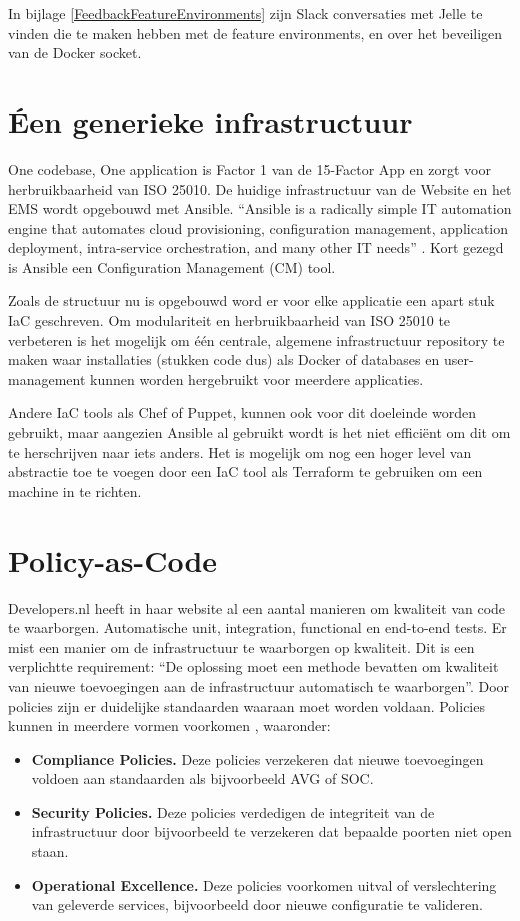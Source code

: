 In bijlage \ref{FeedbackFeatureEnvironments} zijn Slack conversaties met Jelle te vinden die te maken hebben met de feature environments, en over het beveiligen van de Docker socket.

\section{Éen generieke infrastructuur}
One codebase, One application is Factor 1 van de 15-Factor App en zorgt voor herbruikbaarheid van ISO 25010. De huidige infrastructuur van de Website en het EMS wordt opgebouwd met Ansible. \enquote{Ansible is a radically simple IT automation engine that automates cloud provisioning, configuration management, application deployment, intra-service orchestration, and many other IT needs} \parencite{Ansible}. Kort gezegd is Ansible een Configuration Management (CM) tool.

Zoals de structuur nu is opgebouwd word er voor elke applicatie een apart stuk IaC geschreven. Om modulariteit en herbruikbaarheid van ISO 25010 \parencite{ISO25010} te verbeteren is het mogelijk om één centrale, algemene infrastructuur repository te maken waar installaties (stukken code dus) als Docker of databases en user-management kunnen worden hergebruikt voor meerdere applicaties. 

Andere IaC tools als Chef of Puppet, kunnen ook voor dit doeleinde worden gebruikt, maar aangezien Ansible al gebruikt wordt is het niet efficiënt om dit om te herschrijven naar iets anders. Het is mogelijk om nog een hoger level van abstractie toe te voegen door een IaC tool als Terraform te gebruiken om een machine in te richten.

\section{Policy-as-Code} %
Developers.nl heeft in haar website al een aantal manieren om kwaliteit van code te waarborgen. Automatische unit, integration, functional en end-to-end tests. Er mist een manier om de infrastructuur te waarborgen op kwaliteit. Dit is een verplichtte requirement: \enquote{De oplossing moet een methode bevatten om kwaliteit van nieuwe toevoegingen aan de infrastructuur automatisch te waarborgen}. Door policies zijn er duidelijke standaarden waaraan moet worden voldaan. Policies kunnen in meerdere vormen voorkomen \parencite{WhyPaC}, waaronder:
\begin{itemize}
	\item \textbf{Compliance Policies.} Deze policies verzekeren dat nieuwe toevoegingen voldoen aan standaarden als bijvoorbeeld AVG of SOC.
	\item \textbf{Security Policies.} Deze policies verdedigen de integriteit van de infrastructuur door bijvoorbeeld te verzekeren dat bepaalde poorten niet open staan.
	\item \textbf{Operational Excellence.} Deze policies voorkomen uitval of verslechtering van geleverde services, bijvoorbeeld door nieuwe configuratie te valideren.
\end{itemize}

